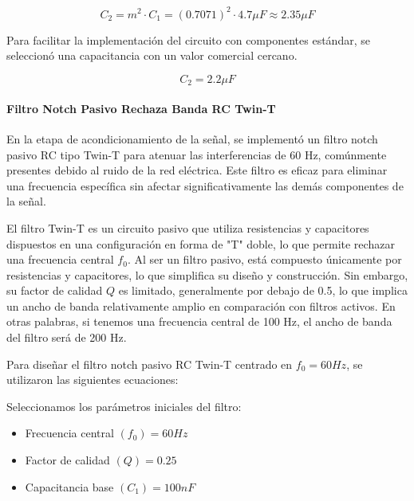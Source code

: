                     \begin{equation}
                        \label{eq:capacitancia_C2_pasa_bajos}
                        C_2 = m^2 \cdot C_1 = (0.7071)^2 \cdot 4.7 \mu F \approx 2.35 \mu F
                    \end{equation}

                    Para facilitar la implementación del circuito con componentes estándar, se seleccionó una capacitancia con un valor comercial cercano.

                    \begin{equation}
                        C_2 = 2.2 \mu F
                    \end{equation}
            
            \paragraph{Filtro Notch Pasivo Rechaza Banda RC Twin-T}
                En la etapa de acondicionamiento de la señal, se implementó un filtro notch pasivo RC tipo Twin-T para atenuar las interferencias de 60 Hz, comúnmente presentes debido al ruido de la red eléctrica. Este filtro es eficaz para eliminar una frecuencia específica sin afectar significativamente las demás componentes de la señal.

                El filtro Twin-T es un circuito pasivo que utiliza resistencias y capacitores dispuestos en una configuración en forma de "T" doble, lo que permite rechazar una frecuencia central $f_0$. Al ser un filtro pasivo, está compuesto únicamente por resistencias y capacitores, lo que simplifica su diseño y construcción. Sin embargo, su factor de calidad $Q$ es limitado, generalmente por debajo de 0.5, lo que implica un ancho de banda relativamente amplio en comparación con filtros activos. En otras palabras, si tenemos una frecuencia central de 100 Hz, el ancho de banda del filtro será de 200 Hz.

                Para diseñar el filtro notch pasivo RC Twin-T centrado en $f_0 = 60 Hz$, se utilizaron las siguientes ecuaciones:

                Seleccionamos los parámetros iniciales del filtro:
                \begin{itemize}
                    \item Frecuencia central $(f_0) = 60 Hz$
                    \item Factor de calidad $(Q) = 0.25$
                    \item Capacitancia base $(C_1) = 100 nF$
                \end{itemize}

